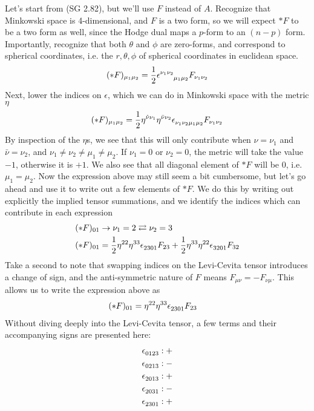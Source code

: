 Let's start from (SG 2.82), but we'll use $F$ instead of $A$. Recognize that Minkowski space is 4-dimensional, and $F$ is a two form, so we will expect $\ast F$ to be a two form as well, since the Hodge dual maps a $p$-form to an $(n-p)$ form. Importantly, recognize that both $\theta$ and $\phi$ are zero-forms, and correspond to spherical coordinates, i.e. the $r, \theta, \phi$ of spherical coordinates in euclidean space. 
%
\begin{align}
	(\ast F)_{\mu_1 \mu_2} = \frac{1}{2} \epsilon\indices{^{{\nu_1}{\nu_2}}_{{\mu_1}{\mu_2}}} F_{\nu_1 \nu_2}
\end{align} 
%
Next, lower the indices on $\epsilon$, which we can do in Minkowski space with the metric $\eta$
%
\begin{align}
	(\ast F)_{\mu_1 \mu_2} = \frac{1}{2} \eta\indices{^{\hat{\nu}\nu_1}}  \eta\indices{^{\bar{\nu}\nu_2}} \epsilon\indices{_{{\nu_1}{\nu_2}{\mu_1}{\mu_2}}} F_{\nu_1 \nu_2}
\end{align} 
%
By inspection of the $\eta$s, we see that this will only contribute when $\hat{\nu} = \nu_1$ and $\bar{\nu} = \nu_2$, and $\nu_1 \neq \nu_2 \neq \mu_1 \neq \mu_2$. If $\nu_1=0$ or $\nu_2=0$, the metric will take the value $-1$, otherwise it is $+1$. We also see that all diagonal element of $\ast F$ will be $0$, i.e. $\mu_1 = \mu_2$. Now the expression above may still seem a bit cumbersome, but let's go ahead and use it to write out a few elements of $\ast F$. We do this by writing out explicitly the implied tensor summations, and we identify the indices which can contribute in each expression
%
\begin{align}
	&(\ast F)_{0 1} \rightarrow \nu_1 = 2 \rightleftarrows \nu_2 = 3 \\
	&(\ast F)_{0 1} = \frac{1}{2} \eta\indices{^{22}}  \eta\indices{^{33}} \epsilon\indices{_{2301}} F_{23} + \frac{1}{2} \eta\indices{^{33}}  \eta\indices{^{22}} \epsilon\indices{_{3201}} F_{32}
\end{align}
%
Take a second to note that swapping indices on the Levi-Cevita tensor introduces a change of sign, and the anti-symmetric nature of $F$ means $F_{\mu\nu} = - F_{\nu\mu}$. This allows us to write the expression above as
%
\begin{align} \label{star_f_simple}
	&(\ast F)_{0 1} = \eta\indices{^{22}}  \eta\indices{^{33}} \epsilon\indices{_{2301}} F_{23}
\end{align}
%
Without diving deeply into the Levi-Cevita tensor, a few terms and their accompanying signs are presented here: 
%
\begin{align}
\epsilon\indices{_{0123}}: +\\
\epsilon\indices{_{0213}}: -\\
\epsilon\indices{_{2013}}: +\\
\epsilon\indices{_{2031}}: -\\
\epsilon\indices{_{2301}}: +
\end{align}
